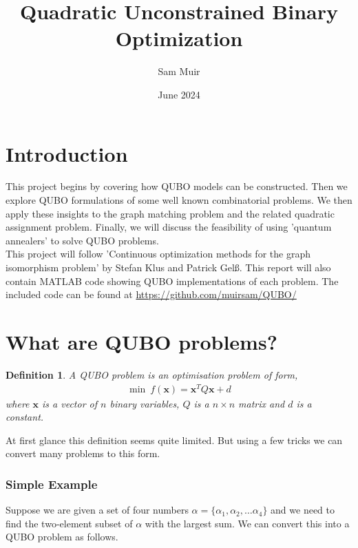 \documentclass{article}
\title{Quadratic Unconstrained Binary Optimization}
\author{Sam Muir }
\date{June 2024}
\newtheorem{defn}[prop]{Definition}
\begin{document}
\maketitle

\section{Introduction}

This project begins by covering how QUBO models can be constructed. Then we explore QUBO formulations of some well known combinatorial problems. We then apply these insights to the graph matching problem and the related quadratic assignment problem. Finally, we will discuss the feasibility of using 'quantum annealers' to solve QUBO problems. \\

\noindent This project will follow 'Continuous optimization methods for the graph isomorphism problem' by Stefan Klus and Patrick Gelß. This report will also contain MATLAB code showing QUBO implementations of each problem. The included code can be found at \href{https://github.com/muirsam/QUBO/}{https://github.com/muirsam/QUBO/}

\section{What are QUBO problems?}
\begin{defn}
A QUBO problem is an optimisation problem of form, 
\begin{align*}
    \min \: f(\mathbf{x}) = \mathbf{x}^T Q \mathbf{x} + d
\end{align*}
where \(\mathbf{x}\) is a vector of \(n\) binary variables, \(Q\) is a \(n \times n\) matrix and \(d\) is a constant.
\end{defn}

\noindent At first glance this definition seems quite limited. But using a few tricks we can convert many problems to this form.

\subsubsection{Simple Example}
\noindent Suppose we are given a set of four numbers \(\alpha = \{\alpha_1,\alpha_2, \dots \alpha_4\}\) and we need to find the two-element subset of \(\alpha\) with the largest sum. We can convert this into a QUBO problem as follows. \\
\end{document}
